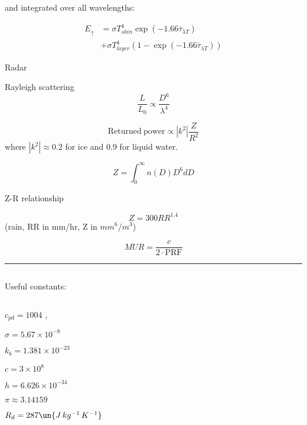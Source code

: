 \documentclass[12pt]{article}
\begin{document}
\begin{multicols}{2}
\noindent
and integrated over all wavelengths:

     \begin{align}
       \label{eq:constantT}
       E_{\uparrow} &= \sigma T_{skin}^4 \exp( -1.66 \overline{\tau}_{\lambda T}  ) \nonumber \\
       & + \sigma T_{layer}^4(1- \exp( -1.66 \overline{\tau}_{\lambda T} ))
     \end{align}

\noindent
Radar


\noindent
Rayleigh scattering
\begin{equation}
  \label{eq:scatter}
  \frac{L}{L_0} \propto \frac{D^6}{\lambda^4}
\end{equation}

\begin{equation}
\label{eq:radar}
  \mathrm{Returned\ power} \propto |k^2| \frac{Z}{R^2}
\end{equation}
where $|k^2| \approx 0.2$ for ice and 0.9 for liquid water.

\begin{equation}
  \label{eq:Z}
  Z = \int_0^\infty n(D) D^6 dD
\end{equation}

\noindent
Z-R relationship

\begin{equation}
  \label{eq:zr}
  Z = 300 RR^{1.4}
\end{equation}
(rain, RR in mm/hr, Z in $mm^6/m^3$)

\begin{equation}
  \label{eq:range}
  MUR = \frac{c}{2 \cdot \mathrm{PRF}}
\end{equation}


\rule{3cm}{.1mm}



$~$

\noindent
Useful constants:

$~$

$c_{pd}=1004$ , 

$\sigma=5.67 \times  10^{-8}$ 

$k_b = 1.381  \times 10^{-23}$  

$c=3 \times 10^{8}$ 

$h=6.626 \times 10^{-34}$ 

$\pi \approx 3.14159$

 $R_d=287 \un{J\,kg^{-1}\,K^{-1}}$


\end{multicols}
\end{document}
